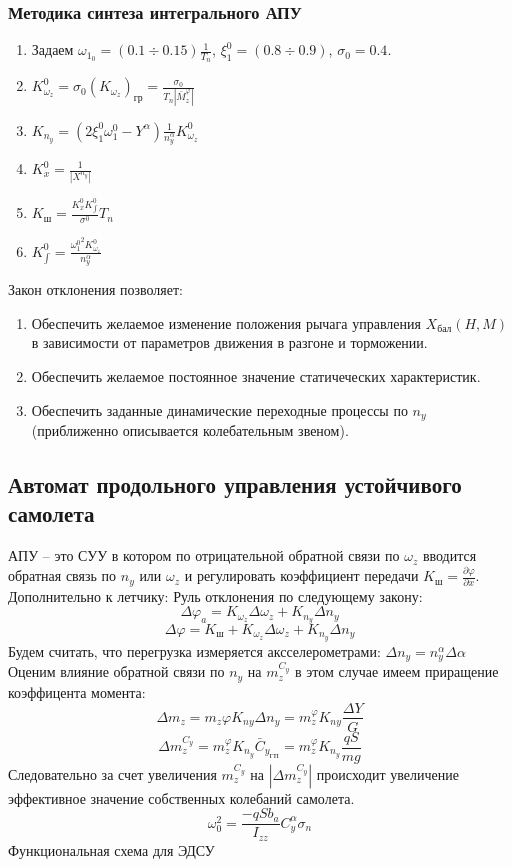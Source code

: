 \documentclass{article}
\begin{document}
\subsubsection{Методика синтеза интегрального АПУ}
\begin{enumerate}
\item Задаем $\omega_{{1}_{0}} = (0.1 \div 0.15) \frac{1}{T_n}$, $\xi_1^0 = (0.8 \div 0.9)$, $\sigma_0 = 0.4$.
\item $K_{\omega_z}^0 = \sigma_0 (K_{\omega_z})_{гр} = \frac{\sigma_0}{T_n|\bar{M}_z^\varphi|}$
\item $K_{n_y} = (2\xi_1^0 \omega_1^0 - Y^\alpha)\frac{1}{n_y^\alpha} K_{\omega_z}^0$
\item $K_x^0 = \frac{1}{|X^{n_y}|}$
\item $K_{ш} = \frac{K_x^0 K_{\int}^0}{\sigma^0}T_n$
\item $K_{\int}^0 = \frac{{\omega_1^0}^2 K_{\omega_z}^0}{n_y^\alpha}$
\end{enumerate}
Закон отклонения позволяет:
\begin{enumerate}
\item Обеспечить желаемое изменение положения рычага управления $X_{бал}(H,M)$ в зависимости от параметров движения в разгоне и торможении.
\item Обеспечить желаемое постоянное значение статичеческих характеристик.
\item Обеспечить заданные динамические переходные процессы по $n_y$ (приближенно описывается колебательным звеном).
\end{enumerate}
\subsection{Автомат продольного управления устойчивого самолета}
АПУ -- это СУУ в котором по отрицательной обратной связи по $\omega_z$ вводится обратная связь по $n_y$ или $\omega_z$ и регулировать коэффициент передачи $K_{ш}=\frac{\partial \varphi}{\partial x}$.\\
Дополнительно к летчику:
Руль отклонения по следующему закону:
\[
\Delta \varphi_a  = K_{\omega_z} \Delta \omega_z + K_{n_y} \Delta n_y
\]
\[
\Delta \varphi = K_{ш} + K_{\omega_z}\Delta \omega_z + K_{n_y} \Delta n_y
\]
Будем считать, что перегрузка измеряется аксселерометрами: $\Delta n_y = n_y^\alpha \Delta \alpha$
Оценим влияние обратной связи по $n_y$ на $m_z^{C_y}$ в этом случае имеем приращение коэффицента момента:
\[
\Delta m_z = m_z \varphi K_{ny}\Delta n_y = m_z^\varphi K_{ny} \frac{\Delta Y}{G}
\]
\[
\Delta m_z^{C_y} = m_z^\varphi K_{n_y} \bar{C}_{y_{ГП}} = m_z^\varphi K_{n_y} \frac{qS}{mg}
\]
Следовательно за счет увеличения $m_z^{C_y}$ на $|\Delta m_z^{C_y}|$ происходит увеличение эффективное значение собственных колебаний самолета.
\[
\omega_0^2 = \frac{-qS b_a}{I_{zz}} C_y^\alpha \sigma_n
\]
Функциональная схема для ЭДСУ
\end{document}
